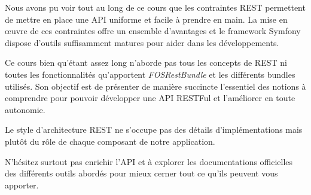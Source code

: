 \documentclass[big]{zmdocument}
\begin{document}
\horizontalLine



Nous avons pu voir tout au long de ce cours que les contraintes REST permettent de mettre en place une API uniforme et facile à prendre en main. La mise en œuvre de ces contraintes offre un ensemble d'avantages et le framework Symfony dispose d'outils suffisamment matures pour aider dans les développements.



Ce cours bien qu'étant assez long n'aborde pas tous les concepts de REST ni toutes les fonctionnalités qu'apportent \textit{FOSRestBundle} et les différents bundles utilisés. Son objectif est de présenter de manière succincte l'essentiel des notions à comprendre pour pouvoir développer une API RESTFul et l'améliorer en toute autonomie.



Le style d'architecture REST ne s'occupe pas des détails d'implémentations mais plutôt du rôle de chaque composant de notre application.



N'hésitez surtout pas enrichir l'API et à explorer les documentations officielles des différents outils abordés pour mieux cerner tout ce qu'ils peuvent vous apporter.
\end{document}
